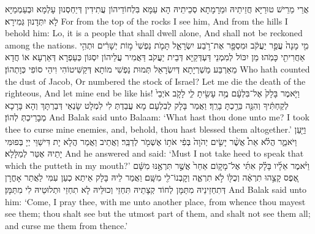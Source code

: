 {אֲרֵי מֵרֵישׁ טוּרַיָּא חֲזֵיתֵיהּ וּמֵרָמָתָא סְכֵיתֵיהּ הָא עַמָּא בִּלְחוֹדֵיהוֹן עֲתִידִין דְּיַחְסְנוּן עָלְמָא וּבְעַמְמַיָּא לָא יִתְּדָנוּן גְּמִירָא׃}
{For from the top of the rocks I see him, And from the hills I behold him: Lo, it is a people that shall dwell alone, And shall not be reckoned among the nations.}{}
{מִ֤י מָנָה֙ עֲפַ֣ר יַעֲקֹ֔ב וּמִסְפָּ֖ר אֶת־רֹ֣בַע יִשְׂרָאֵ֑ל תָּמֹ֤ת נַפְשִׁי֙ מ֣וֹת יְשָׁרִ֔ים וּתְהִ֥י אַחֲרִיתִ֖י כָּמֹֽהוּ׃
}
{מַן יִכּוֹל לְמִמְנֵי דַּעְדְּקַיָּא דְּבֵית יַעֲקֹב דַּאֲמִיר עֲלֵיהוֹן יִסְגּוֹן כְּעַפְרָא דְּאַרְעָא אוֹ חֲדָא מֵאַרְבַּע מַשְׁרְיָתָא דְּיִשְׂרָאֵל תְּמוּת נַפְשִׁי מוֹתָא דְּקַשִּׁיטוֹהִי וִיהֵי סוֹפִי כְּוָתְהוֹן׃}
{Who hath counted the dust of Jacob, Or numbered the stock of Israel? Let me die the death of the righteous, And let mine end be like his!}{}
{וַיֹּ֤אמֶר בָּלָק֙ אֶל־בִּלְעָ֔ם מֶ֥ה עָשִׂ֖יתָ לִ֑י לָקֹ֤ב אֹיְבַי֙ לְקַחְתִּ֔יךָ וְהִנֵּ֖ה בֵּרַ֥כְתָּ בָרֵֽךְ׃}
{וַאֲמַר בָּלָק לְבִלְעָם מָא עֲבַדְתְּ לִי לִמְלָט שָׂנְאַי דְּבַרְתָּךְ וְהָא בָּרָכָא מְבָרֵיכְתְּ לְהוֹן׃}
{And Balak said unto Balaam: ‘What hast thou done unto me? I took thee to curse mine enemies, and, behold, thou hast blessed them altogether.’}{}
{וַיַּ֖עַן וַיֹּאמַ֑ר הֲלֹ֗א אֵת֩ אֲשֶׁ֨ר יָשִׂ֤ים יְהֹוָה֙ בְּפִ֔י אֹת֥וֹ אֶשְׁמֹ֖ר לְדַבֵּֽר׃}
{וַאֲתֵיב וַאֲמַר הֲלָא יָת דִּישַׁוֵּי יְיָ בְּפוּמִּי יָתֵיהּ אֶטַּר לְמַלָּלָא׃}
{And he answered and said: ‘Must I not take heed to speak that which the \lord\space putteth in my mouth?’}{}
{וַיֹּ֨אמֶר אֵלָ֜יו בָּלָ֗ק  אִתִּ֜י אֶל־מָק֤וֹם אַחֵר֙ אֲשֶׁ֣ר תִּרְאֶ֣נּוּ מִשָּׁ֔ם אֶ֚פֶס קָצֵ֣הוּ תִרְאֶ֔ה וְכֻלּ֖וֹ לֹ֣א תִרְאֶ֑ה וְקׇבְנוֹ־לִ֖י מִשָּֽׁם׃
}
{וַאֲמַר לֵיהּ בָּלָק אֵיתַא כְעַן עִמִּי לַאֲתַר אָחֳרָן דְּתִחְזֵינֵיהּ מִתַּמָּן לְחוֹד קְצָתֵיהּ תִּחְזֵי וְכוּלֵּיהּ לָא תִחְזֵי וּתְלוּטֵיהּ לִי מִתַּמָּן׃}
{And Balak said unto him: ‘Come, I pray thee, with me unto another place, from whence thou mayest see them; thou shalt see but the utmost part of them, and shalt not see them all; and curse me them from thence.’}{}

